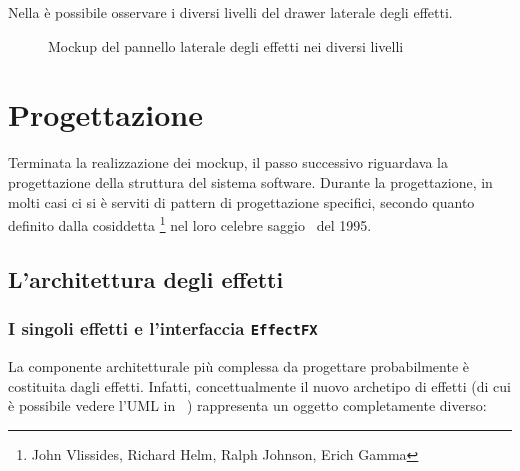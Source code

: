 \begin{description}
                Nella  è possibile osservare i diversi livelli del drawer laterale degli effetti.

                \begin{figure}[htbp]
                    \centering%
                    \qquad{\LARGE$\Rightarrow$}\qquad
                    \qquad{\LARGE$\Rightarrow$}\qquad
                    \caption{Mockup del pannello laterale degli effetti nei diversi livelli\label{fig:mock:allEffects}}
                \end{figure}
        \end{description}

    \section{Progettazione}\label{sec:progettazione}
        Terminata la realizzazione dei mockup, il passo successivo riguardava la progettazione della struttura del sistema software.
        Durante la progettazione, in molti casi ci si è serviti di pattern di progettazione specifici, secondo quanto definito dalla cosiddetta \footnote{John Vlissides, Richard Helm, Ralph Johnson, Erich Gamma} nel loro celebre saggio~\cite{designPattern} del 1995.

        \subsection{L'architettura degli effetti}\label{subsec:effetti}
            \subsubsection{I singoli effetti e l'interfaccia \texttt{EffectFX}}\label{subsubsec:effectFX}
                La componente architetturale più complessa da progettare probabilmente è costituita dagli effetti.
                Infatti, concettualmente il nuovo archetipo di effetti (di cui è possibile vedere l'UML in~%
                ) rappresenta un oggetto completamente diverso:

